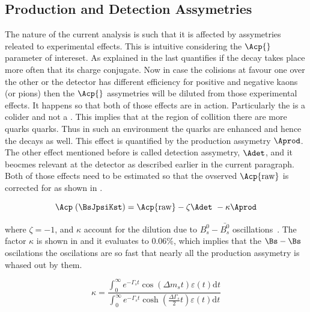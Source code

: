 \subsection{Production and Detection Assymetries}
\label{experimentalAssym}
The nature of the current analysis is such that it is affected by assymetries releated to experimental effects.
This is intuitive considering the $\Acp{}$ parameter of intereset. As explained in 
the last quantifies if the decay \BsJpsiKst takes place more often that its charge conjugate. Now in case the
colisions at \lhc favour one over the other or the detector has different efficiency for positive and negative 
kaons (or pions) then the $\Acp{}$ assymetries will be diluted from those experimental effects. It happens so that
both of those effects are in action. Particularly the \lhc is a \proton\proton colider and not a \proton\antiproton .
This implies that at the region of collition there are more \bquark quarks \bquarkbar quarks. 
Thus in such an environment the \bquark quarks are enhanced and hence the \BsbarJpsiKst 
decays as well. This effect is quantified by the production assymetry $\Aprod$. The other effect mentioned before
is called detection assymetry, $\Adet$, and it beocmes relevant at the \lhcb detector as described earlier in the
current paragraph. Both of those effects need to be estimated so that the ovserved $\Acp{\rm raw}$ is corrected for
as shown in .

\begin{equation}
\Acp\;(\BsJpsiKst) = \Acp{\rm raw} - \zeta \Adet\ - \kappa\Aprod
\label{acp_corrected}
\end{equation}

\noindent where $\zeta = -1$, and $\kappa$ account for the dilution due to $B^0_s-\bar{B^0_s}$ 
oscillations~\cite{LHCb-PAPER-2013-018}. The factor $\kappa$ is shown in  and it evaluates to $0.06\%$, 
which implies that the $\Bs-\Bs$ oscilations the oscilations are so fast that nearly all the production assymetry
is whased out by them.

\begin{equation}
 \kappa = \frac{\int_0^\infty  e^{-\Gamma_s t} \cos \!\left( \Delta m_s t \right ) \varepsilon(t)\mathrm{d}t}{\int_0^\infty  e^{-\Gamma_s t} \cosh \left( \frac{\Delta \Gamma_s}{2} t \right ) \varepsilon(t)\mathrm{d}t}
\label{kappa}
\end{equation}

